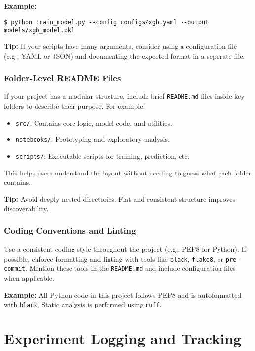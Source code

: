 \documentclass[12pt,openany]{book}
\begin{document}
\textbf{Example:}
\begin{verbatim}
$ python train_model.py --config configs/xgb.yaml --output models/xgb_model.pkl
\end{verbatim}

\textbf{Tip:} If your scripts have many arguments, consider using a configuration file (e.g., YAML or JSON) and documenting the expected format in a separate file.

\subsection{Folder-Level README Files}

If your project has a modular structure, include brief \texttt{README.md} files inside key folders to describe their purpose. For example:

\begin{itemize}
    \item \texttt{src/}: Contains core logic, model code, and utilities.
    \item \texttt{notebooks/}: Prototyping and exploratory analysis.
    \item \texttt{scripts/}: Executable scripts for training, prediction, etc.
\end{itemize}

This helps users understand the layout without needing to guess what each folder contains.

\textbf{Tip:} Avoid deeply nested directories. Flat and consistent structure improves discoverability.

\subsection{Coding Conventions and Linting}

Use a consistent coding style throughout the project (e.g., PEP8 for Python). If possible, enforce formatting and linting with tools like \texttt{black}, \texttt{flake8}, or \texttt{pre-commit}. Mention these tools in the \texttt{README.md} and include configuration files when applicable.

\textbf{Example:} All Python code in this project follows PEP8 and is autoformatted with \texttt{black}. Static analysis is performed using \texttt{ruff}.




\chapter{Experiment Logging and Tracking}
\end{document}
